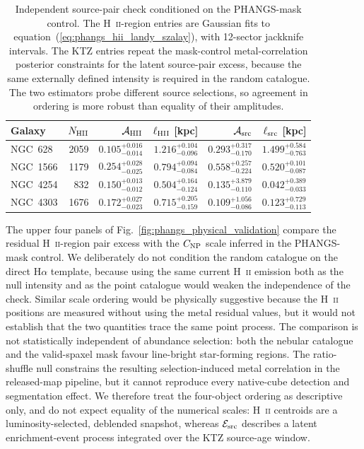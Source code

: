 \documentclass[fleqn,usenatbib]{mnras}
\begin{document}
\begin{table}
\centering
\scriptsize
\setlength{\tabcolsep}{5pt}
\caption{Independent source-pair check conditioned on the PHANGS-mask control.  The H~\textsc{ii}-region entries are Gaussian fits to equation~(\ref{eq:phangs_hii_landy_szalay}), with 12-sector jackknife intervals.  The KTZ entries repeat the mask-control metal-correlation posterior constraints for the latent source-pair excess, because the same externally defined intensity is required in the random catalogue.  The two estimators probe different source selections, so agreement in ordering is more robust than equality of their amplitudes.}
\label{tab:phangs_hii_source_pairs}
\begin{tabular}{@{}lrrrrr@{}}
\toprule
Galaxy & $N_{\rm HII}$ & ${\cal A}_{\rm HII}$ & $\ell_{\rm HII}$ [kpc] & ${\cal A}_{\rm src}$ & $\ell_{\rm src}$ [kpc]\\
\midrule
NGC~628  & 2059 & $0.105_{-0.014}^{+0.016}$ & $1.216_{-0.096}^{+0.104}$ & $0.293_{-0.170}^{+0.317}$ & $1.499_{-0.763}^{+0.584}$\\
NGC~1566 & 1179 & $0.254_{-0.025}^{+0.028}$ & $0.794_{-0.084}^{+0.094}$ & $0.558_{-0.224}^{+0.257}$ & $0.520_{-0.087}^{+0.101}$\\
NGC~4254 &  832 & $0.150_{-0.012}^{+0.013}$ & $0.504_{-0.124}^{+0.164}$ & $0.135_{-0.110}^{+3.879}$ & $0.042_{-0.033}^{+0.389}$\\
NGC~4303 & 1676 & $0.172_{-0.023}^{+0.027}$ & $0.715_{-0.159}^{+0.205}$ & $0.109_{-0.086}^{+1.056}$ & $0.123_{-0.113}^{+0.729}$\\
\bottomrule
\end{tabular}
\end{table}

The upper four panels of Fig.~\ref{fig:phangs_physical_validation} compare the residual H~\textsc{ii}-region pair excess with the $C_{\rm NP}$ scale inferred in the PHANGS-mask control.  We deliberately do not condition the random catalogue on the direct H$\alpha$ template, because using the same current H~\textsc{ii} emission both as the null intensity and as the point catalogue would weaken the independence of the check.  Similar scale ordering would be physically suggestive because the H~\textsc{ii} positions are measured without using the metal residual values, but it would not establish that the two quantities trace the same point process.  The comparison is not statistically independent of abundance selection: both the nebular catalogue and the valid-spaxel mask favour line-bright star-forming regions.  The ratio-shuffle null constrains the resulting selection-induced metal correlation in the released-map pipeline, but it cannot reproduce every native-cube detection and segmentation effect.  We therefore treat the four-object ordering as descriptive only, and do not expect equality of the numerical scales: H~\textsc{ii} centroids are a luminosity-selected, deblended snapshot, whereas ${\cal E}_{\rm src}$ describes a latent enrichment-event process integrated over the KTZ source-age window.
\end{document}
